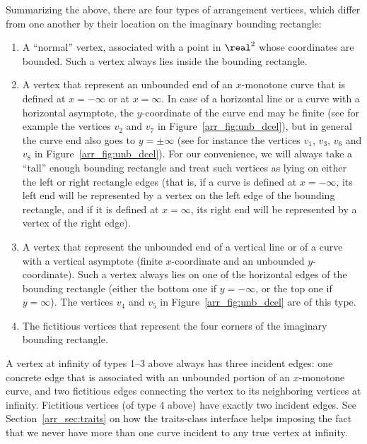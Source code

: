 \begin{ccAdvanced}
Summarizing the above, there are four types of arrangement vertices,
which differ from one another by their location on the imaginary
bounding rectangle:
\begin{enumerate}
\item
A ``normal'' vertex, associated with a point in $\real^2$ whose
coordinates are bounded. Such a vertex always lies inside the
bounding rectangle.
\item
A vertex that represent an unbounded end of an $x$-monotone curve
that is defined at $x = -\infty$ or at $x = \infty$. In case of
a horizontal line or a curve with a horizontal asymptote, the
$y$-coordinate of the curve end may be finite (see for example the
vertices $v_2$ and $v_7$ in Figure~\ref{arr_fig:unb_dcel}), but in
general the curve end also goes to $y = \pm\infty$ (see for instance
the vertices $v_1$, $v_3$, $v_6$ and $v_8$ in
Figure~\ref{arr_fig:unb_dcel}). For our convenience, we will always
take a ``tall'' enough bounding rectangle and treat such vertices as
lying on either the left or right rectangle edges (that is, if a curve
is defined at $x = -\infty$, its left end will be represented by
a vertex on the left edge of the bounding rectangle, and if it is
defined at $x = \infty$, its right end will be represented by a
vertex of the right edge).
\item
A vertex that represent the unbounded end of a vertical line or of a
curve with a vertical asymptote (finite $x$-coordinate and an
unbounded $y$-coordinate). Such a vertex always lies on one of the
horizontal edges of the bounding rectangle (either the bottom one if
$y = -\infty$, or the top one if $y = \infty$). The vertices $v_4$ 
and $v_5$ in Figure~\ref{arr_fig:unb_dcel} are of this type.
\item
The fictitious vertices that represent the four corners of the
imaginary bounding rectangle.
\end{enumerate}
A vertex at infinity of types 1--3 above always has
three incident edges: one concrete edge that is associated with an
unbounded portion of an $x$-monotone curve, and two fictitious edges
connecting the vertex to its neighboring vertices at infinity.
Fictitious vertices (of type 4 above) have exactly two incident edges.
See Section~\ref{arr_sec:traits} on how the traits-class interface
helps imposing the fact that we never have more than one curve
incident to any true vertex at infinity.


\end{ccAdvanced}
